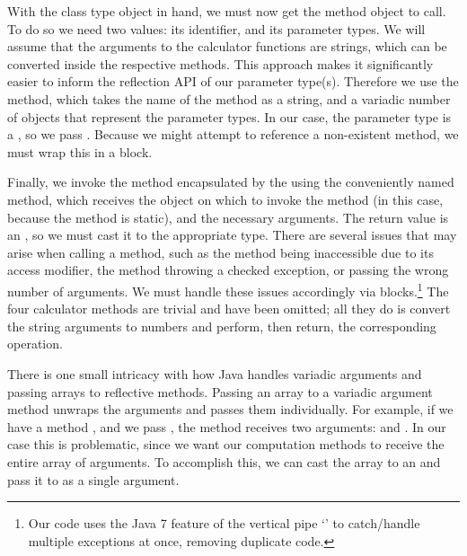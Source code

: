 With the class type object in hand, we must now get the method object to call. To do so we need two values: its identifier, and its parameter types. We will assume that the arguments to the calculator functions are strings, which can be converted inside the respective methods. This approach makes it significantly easier to inform the reflection API of our parameter type(s). Therefore we use the  method, which takes the name of the method as a string, and a variadic number of  objects that represent the parameter types. In our case, the parameter type is a , so we pass . Because we might attempt to reference a non-existent method, we must wrap this in a  block.

Finally, we invoke the method encapsulated by the  using the conveniently named  method, which receives the object on which to invoke the method (in this case,  because the method is static), and the necessary arguments. The return value is an , so we must cast it to the appropriate type. There are several issues that may arise when calling a method, such as the method being inaccessible due to its access modifier, the method throwing a checked exception, or passing the wrong number of arguments. We must handle these issues accordingly via  blocks.\footnote{Our code uses the Java 7 feature of the vertical pipe `\ttt{|}' to catch/handle multiple exceptions at once, removing duplicate code.} The four calculator methods are trivial and have been omitted; all they do is convert the string arguments to numbers and perform, then return, the corresponding operation.

There is one small intricacy with how Java handles variadic arguments and passing arrays to reflective methods. Passing an array to a variadic argument method unwraps the arguments and passes them individually. For example, if we have a method , and we pass , the method receives two arguments:  and . In our case this is problematic, since we want our computation methods to receive the entire array of arguments. To accomplish this, we can cast the array to an  and pass it to  as a single argument.

